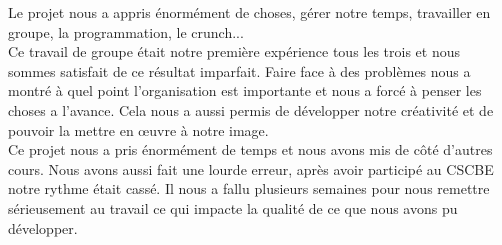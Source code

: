 \documentclass[../main.tex]{subfiles}
\begin{document}
Le projet nous a appris énormément de choses, gérer notre temps, travailler en groupe, la programmation, le crunch... \\
Ce travail de groupe était notre première expérience tous les trois et nous sommes satisfait de ce résultat imparfait. Faire face à des problèmes nous a montré à quel point l’organisation est importante et nous a forcé à penser les choses a l’avance.
Cela nous a aussi permis de développer notre créativité et de pouvoir la mettre en œuvre à notre image. \\

Ce projet nous a pris énormément de temps et nous avons mis de côté d’autres cours. Nous avons aussi fait une lourde erreur, après avoir participé au CSCBE notre rythme était cassé. Il nous a fallu plusieurs semaines pour nous remettre sérieusement au travail ce qui impacte la qualité de ce que nous avons pu développer.
\end{document}
